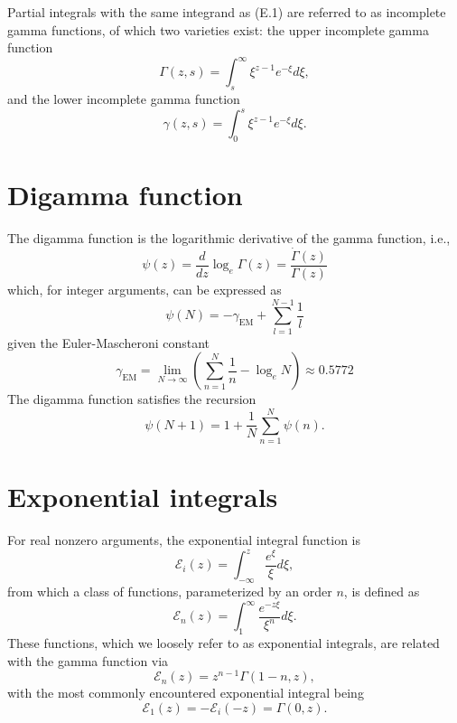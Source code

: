 \documentclass[a4paper, 12pt]{book}
\begin{document}
Partial integrals with the same integrand as (E.1) are referred to as incomplete gamma functions, of which two varieties exist: the upper incomplete gamma function
\begin{equation}
    \Gamma(z,s)=\int_{s}^{\infty}\xi^{z-1}e^{-\xi}d\xi, \tag{E.2}
\end{equation}
and the lower incomplete gamma function
\begin{equation}
    \gamma(z,s)=\int_{0}^{s}\xi^{z-1}e^{-\xi}d\xi. \tag{E.3}
\end{equation}

\section{Digamma function}
The digamma function is the logarithmic derivative of the gamma function, i.e.,
\begin{equation}
    \psi(z)=\frac{d}{dz}\log_{e}\Gamma(z) = \frac{\dot{\Gamma}(z)}{\Gamma(z)} \tag{E.4}
\end{equation}
which, for integer arguments, can be expressed as
\begin{equation}
    \psi(N)=-\gamma_{\text{EM}}+\sum_{l=1}^{N-1}\frac{1}{l} \tag{E.5}
\end{equation}
given the Euler-Mascheroni constant
\begin{equation}
    \gamma_{\text{EM}}=\lim_{N\rightarrow\infty}\left(\sum_{n=1}^{N}\frac{1}{n}-\log_{e}N\right) \approx 0.5772 \tag{E.6}
\end{equation}
The digamma function satisfies the recursion
\begin{equation}
    \psi(N+1)=1+\frac{1}{N}\sum_{n=1}^{N}\psi(n). \tag{E.7}
\end{equation}

\section{Exponential integrals}
For real nonzero arguments, the exponential integral function is
\begin{equation}
    \mathcal{E}_{i}(z)=\int_{-\infty}^{z}\frac{e^{\xi}}{\xi}d\xi, \tag{E.10}
\end{equation}
from which a class of functions, parameterized by an order $n$, is defined as
\begin{equation}
    \mathcal{E}_{n}(z)=\int_{1}^{\infty}\frac{e^{-z\xi}}{\xi^{n}}d\xi. \tag{E.11}
\end{equation}
These functions, which we loosely refer to as exponential integrals, are related with the gamma function via
\begin{equation}
    \mathcal{E}_{n}(z)=z^{n-1}\Gamma(1-n,z), \tag{E.12}
\end{equation}
with the most commonly encountered exponential integral being
\begin{equation}
    \mathcal{E}_{1}(z)=-\mathcal{E}_{i}(-z) = \Gamma(0,z). \tag{E.13}
\end{equation}
\end{document}
